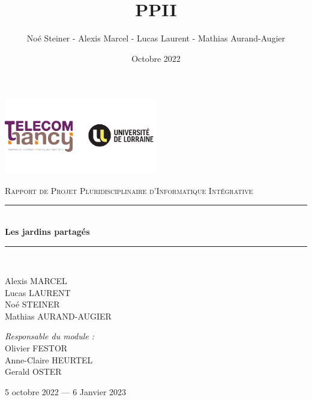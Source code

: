 \documentclass[french,a4paper]{article}
\title{PPII}
\author{Noé Steiner - Alexis Marcel - Lucas Laurent - Mathias Aurand-Augier}
\date{Octobre 2022}
\newcommand{\HRule}{\rule{\linewidth}{0.5mm}}
\begin{document}
\begin{titlepage}
    \begin{center}

    \includegraphics[width=0.5\textwidth]{tele_univ.png}

    \textsc{\Large Rapport de Projet Pluridisciplinaire d'Informatique Intégrative}\\[1.5cm]

    \HRule \\[0.4cm]
    { \huge \bfseries Les jardins partagés\\[0.4cm] }

    \HRule \\[2cm]

    \begin{minipage}{0.4\textwidth}
      \begin{flushleft} \large
        Alexis MARCEL\\
        Lucas LAURENT\\
        Noé STEINER\\
        Mathias AURAND-AUGIER\\
      \end{flushleft}
    \end{minipage}
    \begin{minipage}{0.4\textwidth}
      \begin{flushright} \large
        \emph{Responsable du module :}\\
        Olivier FESTOR\\
        Anne-Claire HEURTEL\\
        Gerald OSTER\\
      \end{flushright}
    \end{minipage}

    \vfill

    {\large 5 octobre 2022 — 6 Janvier 2023}

  \end{center}
\end{titlepage}
\end{document}
